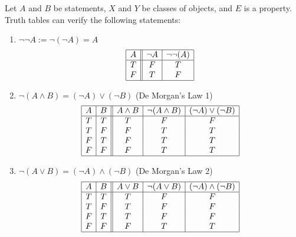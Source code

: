 \begin{example} Let $A$ and $B$ be statements, $X$ and $Y$ be classes of objects, and $E$ is a property. Truth tables can verify the following statements:

    \begin{enumerate}[label=(\alph*)]
        \item $\neg\neg A := \neg(\neg A) = A$
            $$
            \begin{array}{|c||c|c|}
                \hline
                A & \neg A & \neg\neg(A) \\
                \hline
                T & F & T \\
                F & T & F \\
                \hline
            \end{array}
            $$
        \item $\neg(A \land B) = (\neg A) \lor (\neg B)$ (De Morgan's Law 1)
            $$
            \begin{array}{|c|c||c|c|c|}
                \hline
                A & B & A \land B & \neg (A \land B) & (\neg A) \lor (\neg B) \\
                \hline
                T & T & T         & F                & F \\
                T & F & F         & T                & T \\
                F & T & F         & T                & T \\
                F & F & F         & T                & T \\
                \hline
            \end{array}
            $$
        \item $\neg(A \lor B) = (\neg A) \land (\neg B)$ (De Morgan's Law 2)
            $$
            \begin{array}{|c|c||c|c|c|}
                \hline
                A & B & A \lor B & \neg (A \lor B) & (\neg A) \land(\neg B) \\
                \hline
                T & T & T         & F                & F \\
                T & F & T         & F                & F \\
                F & T & T         & F                & F \\
                F & F & F         & T                & T \\
                \hline
            \end{array}
$$
\end{enumerate}
\end{example}
